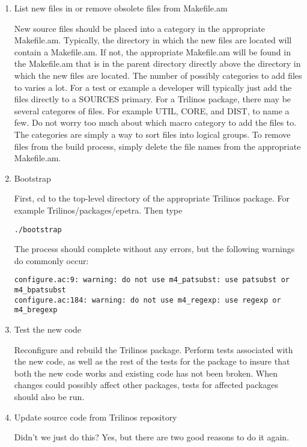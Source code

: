 \documentclass[12pt,relax]{SANDreport}
\begin{document}
\begin{enumerate}
\item List new files in or remove obsolete files from Makefile.am

New source files should be placed into a category in the appropriate 
Makefile.am.  Typically, the directory in which the new files are located will 
contain a Makefile.am.  If not, the appropriate Makefile.am will be found in 
the Makefile.am that is in the parent directory directly above the directory 
in which the new files are located.  The number of possibly categories to add 
files to varies a lot.  For a test or example a developer will typically just 
add the files directly to a SOURCES primary.  For a Trilinos package, there 
may be several categores of files.  For example UTIL, CORE, and DIST, to name 
a few.  Do not worry too much about which macro category to add the files to.  
The categories are simply a way to sort files into logical groups.  To remove 
files from the build process, simply delete the file names from the 
appropriate Makefile.am.

\item Bootstrap

First, cd to the top-level directory of the appropriate Trilinos package.  
For example Trilinos/packages/epetra.  Then type 
\begin{verbatim}
./bootstrap
\end{verbatim}
The process should complete without any errors, but the following warnings do 
commonly occur:
\begin{verbatim}
configure.ac:9: warning: do not use m4_patsubst: use patsubst or m4_bpatsubst
configure.ac:184: warning: do not use m4_regexp: use regexp or m4_bregexp
\end{verbatim}

\item Test the new code

Reconfigure and rebuild the Trilinos package.  Perform tests associated with 
the new code, as well as the rest of the tests for the package to insure that 
both the new code works and existing code has not been broken.  When changes 
could possibly affect other packages, tests for affected packages should also 
be run.

\item Update source code from Trilinos repository

Didn't we just do this?  Yes, but there are two good reasons to do it again.


\end{enumerate}
\end{document}
